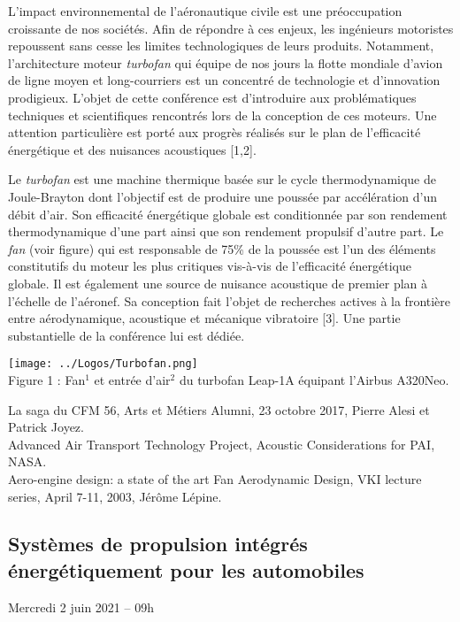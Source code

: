\vspace{1cm}

L’impact environnemental de l’aéronautique civile est une préoccupation croissante de nos sociétés. Afin de répondre à ces enjeux, les ingénieurs motoristes repoussent sans cesse les limites technologiques de leurs produits. Notamment, l’architecture moteur {\slshape turbofan} qui équipe de nos jours la flotte mondiale d’avion de ligne moyen et long-courriers est un concentré de technologie et d'innovation prodigieux. L’objet de cette conférence est d’introduire aux problématiques techniques et scientifiques rencontrés lors de la conception de ces moteurs. Une attention particulière est porté aux progrès réalisés sur le plan de l’efficacité énergétique et des nuisances acoustiques [1,2].

Le {\slshape turbofan} est une machine thermique basée sur le cycle thermodynamique de Joule-Brayton dont l’objectif est de produire une poussée par accélération d’un débit d’air. Son efficacité énergétique globale est conditionnée par son rendement thermodynamique d’une part ainsi que son rendement propulsif d’autre part. Le {\slshape fan} (voir figure) qui est responsable de 75\% de la poussée est l’un des éléments constitutifs du moteur les plus critiques vis-à-vis de l’efficacité énergétique globale. Il est également une source de nuisance acoustique de premier plan à l’échelle de l’aéronef. Sa conception fait l’objet de recherches actives à la frontière entre aérodynamique, acoustique et mécanique vibratoire [3]. Une partie substantielle de la conférence lui est dédiée.

\begin{center}
\texttt{[image: ../Logos/Turbofan.png]} \\
Figure 1 : Fan$^1$ et entrée d’air$^2$ du turbofan Leap-1A équipant l’Airbus A320Neo. 
\end{center}

\noindent [1] La saga du CFM 56, Arts et Métiers Alumni, 23 octobre 2017, Pierre Alesi et Patrick Joyez.\\
\noindent [2] Advanced Air Transport Technology Project, Acoustic Considerations for PAI, NASA.\\
\noindent [3] Aero-engine design: a state of the art Fan Aerodynamic Design, VKI lecture series, April 7-11, 2003, Jérôme Lépine.

%
%

\clearpage
{}\subsection*{Systèmes de propulsion intégrés énergétiquement pour les automobiles}
%
\begin{center}
Mercredi 2 juin 2021 -- 09h
\end{center}


